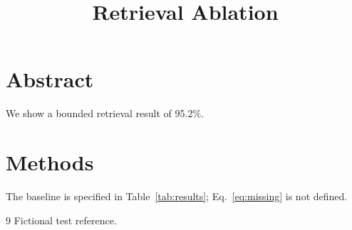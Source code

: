 \documentclass{article}
\title{Retrieval Ablation}
\begin{document}
\section{Abstract}
We show a bounded retrieval result of 95.2\%.
\section{Methods}
The baseline is specified in Table~\ref{tab:results}; Eq.~\eqref{eq:missing} is not defined.

\label{tab:results}
\cite{alpha,beta}
\begin{thebibliography}{9}
 Fictional test reference.
\end{thebibliography}
\end{document}
